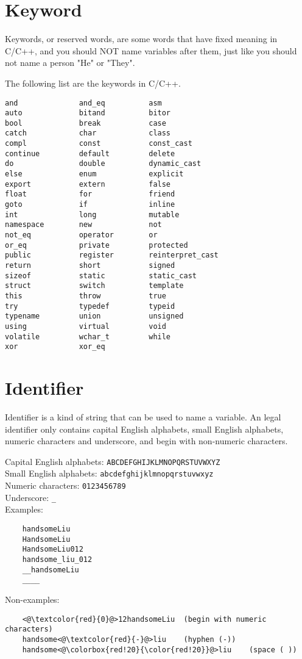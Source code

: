 \documentclass{report}
\begin{document}
\section{Keyword}
    Keywords, or reserved words, are some words that have fixed meaning in C/C++, and you should NOT name variables after them, just like you should not name a person "He" or "They".

    The following list are the keywords in C/C++.
\begin{lstlisting}
and              and_eq          asm
auto             bitand          bitor
bool             break           case
catch            char            class
compl            const           const_cast
continue         default         delete
do               double          dynamic_cast
else             enum            explicit
export           extern          false
float            for             friend
goto             if              inline
int              long            mutable
namespace        new             not
not_eq           operator        or
or_eq            private         protected 
public           register        reinterpret_cast
return           short           signed
sizeof           static          static_cast
struct           switch          template
this             throw           true
try              typedef         typeid
typename         union           unsigned
using            virtual         void
volatile         wchar_t         while
xor              xor_eq 
\end{lstlisting}

\section{Identifier}
    Identifier is a kind of string that can be used to name a variable. An legal identifier only contains capital English alphabets, small English alphabets, numeric characters and underscore, and begin with non-numeric characters.

    Capital English alphabets: \texttt{ABCDEFGHIJKLMNOPQRSTUVWXYZ}\\
    Small English alphabets: \texttt{abcdefghijklmnopqrstuvwxyz}\\
    Numeric characters: \texttt{0123456789}\\
    Underscore: \texttt{\_}\\

Examples:
\begin{lstlisting}
    handsomeLiu
    HandsomeLiu
    HandsomeLiu012
    handsome_liu_012
    __handsomeLiu
    ____
\end{lstlisting}
Non-examples:
\begin{lstlisting}
    <@\textcolor{red}{0}@>12handsomeLiu  (begin with numeric characters)
    handsome<@\textcolor{red}{-}@>liu    (hyphen (-))
    handsome<@\colorbox{red!20}{\color{red!20}}@>liu    (space ( ))
\end{lstlisting}
\end{document}
